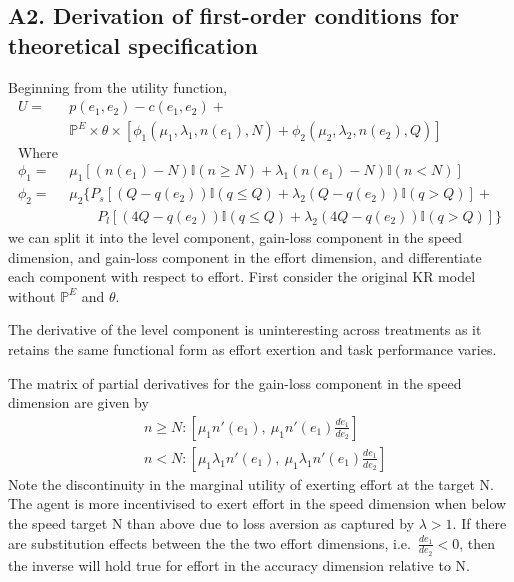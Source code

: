 \documentclass[12pt, letterpaper, DIV=11, numbers=noendperiod]{article}
\begin{document}
\begin{table}[p]
\centering
{\scriptsize\renewcommand{\arraystretch}{0.85}
\par}
\caption{Treatment effects on mistake rates (class sample)}\label{tbl-reg-mistakes-class}
\end{table}

\begin{table}[p]
\centering
{\scriptsize\renewcommand{\arraystretch}{0.85}
\par}
\caption{Treatment effects on sets completed (class sample)}\label{tbl-reg-sets-class}
\end{table}

\subsection{A2. Derivation of first-order conditions for theoretical specification}\label{a2.-derivation-of-first-order-conditions-for-theoretical-specification}

Beginning from the utility function,
\[
\begin{aligned}
U = & p(e_1, e_2) - c(e_1, e_2) + \nonumber \\
    & \mathbb{P}^E \times \theta \times [\phi_1(\mu_1, \lambda_1, n(e_1), N) + \phi_2(\mu_2, \lambda_2, n(e_2), Q)] \nonumber \\
\text{Where}
\\
\phi_1 = & \mu_1[(n(e_1)-N)\mathbb{I}(n \geq N) + \lambda_1(n(e_1)-N)\mathbb{I}(n<N)] \nonumber \\
\phi_2 = & \mu_2 \{P_s[(Q-q(e_2))\mathbb{I}(q \leq Q) + \lambda_2(Q-q(e_2))\mathbb{I}(q>Q)] + \nonumber \\
& \qquad P_l[(4Q-q(e_2))\mathbb{I}(q \leq Q) + \lambda_2(4Q-q(e_2))\mathbb{I}(q>Q)]\}
\end{aligned}
\]
we can split it into the level component, gain-loss component in the speed dimension, and gain-loss component in the effort dimension, and differentiate each component with respect to effort. First consider the original KR model without \(\mathbb{P}^E\) and \(\theta\).

The derivative of the level component is uninteresting across treatments as it retains the same functional form as effort exertion and task performance varies.

The matrix of partial derivatives for the gain-loss component in the speed dimension are given by
\[
\begin{aligned}
& n \geq N: [\mu_1 n'(e_1), \: \mu_1 n'(e_1) \frac {de_1}{de_2}] \nonumber \\
& n < N: [\mu_1 \lambda_1 n'(e_1), \: \mu_1 \lambda_1 n'(e_1) \frac {de_1}{de_2}] \nonumber
\end{aligned}
\]
Note the discontinuity in the marginal utility of exerting effort at the target N. The agent is more incentivised to exert effort in the speed dimension when below the speed target N than above due to loss aversion as captured by \(\lambda>1\). If there are substitution effects between the the two effort dimensions, i.e.~\(\frac {de_1}{de_2}<0\), then the inverse will hold true for effort in the accuracy dimension relative to N.
\end{document}
